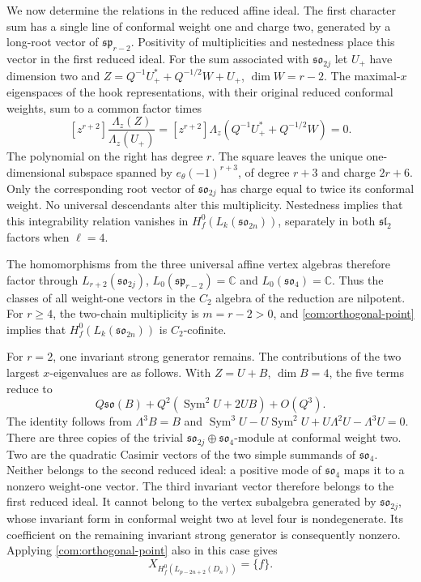 \documentclass[11pt,a4paper]{amsart}
\numberwithin{equation}{section}
\theoremstyle{definition}
\theoremstyle{remark}
\newcommand{\C}{\mathbb C}
\newcommand{\spg}{\mathfrak{sp}}
\newcommand{\sog}{\mathfrak{so}}
\newcommand{\slg}{\mathfrak{sl}}
\newcommand{\Sym}{\operatorname{Sym}}
\begin{document}
We now determine the relations in the reduced affine ideal. The first character sum has a single
line of conformal weight one and charge two, generated by a long-root
vector of $\spg_{r-2}$. Positivity of multiplicities and nestedness place
this vector in the first reduced ideal.
For the sum associated with $\sog_{2j}$ let $U_+$ have dimension two and
$Z=Q^{-1}U_+^*+Q^{-1/2}W+U_+$, $\dim W=r-2$.
The maximal-$x$ eigenspaces of the hook representations, with their
original reduced conformal weights, sum to a common
factor times
$$
 [z^{r+2}]\frac{\Lambda_z(Z)}{\Lambda_z(U_+)}
 =[z^{r+2}]\Lambda_z(Q^{-1}U_+^*+Q^{-1/2}W)=0.
$$
The polynomial on the right has degree $r$. The square leaves the
unique one-dimensional subspace spanned by $e_\theta(-1)^{r+3}$,
of degree $r+3$ and charge
$2r+6$. Only the corresponding root vector of $\sog_{2j}$ has charge equal to twice its conformal weight.
No universal descendants alter this multiplicity. Nestedness implies that this integrability relation vanishes in
$H_f^0(L_k(\sog_{2n}))$, separately in both
$\slg_2$ factors when $\ell=4$.

The homomorphisms from the three universal affine vertex algebras
therefore factor through $L_{r+2}(\sog_{2j})$,
$L_0(\spg_{r-2})=\C$ and $L_0(\sog_4)=\C$.
Thus the classes of all weight-one vectors in the $C_2$ algebra of
the reduction are nilpotent. For $r\ge4$, the two-chain
multiplicity is $m=r-2>0$, and \cref{com:orthogonal-point} implies that
$H_f^0(L_k(\sog_{2n}))$ is $C_2$-cofinite.

For $r=2$, one invariant strong generator remains. The contributions of
the two largest $x$-eigenvalues are as follows. With $Z=U+B$,
$\dim B=4$, the five terms reduce to
$$
 Q\sog(B)+Q^2(\Sym^2U+2UB)+O(Q^3).
$$
The identity follows from $\Lambda^3B=B$ and
$\Sym^3U-U\Sym^2U+U\Lambda^2U-\Lambda^3U=0$.
There are three copies of the trivial $\sog_{2j}\oplus\sog_4$-module
at conformal weight two. Two are the quadratic Casimir vectors of
the two simple summands of $\sog_4$. Neither belongs to the second
reduced ideal: a positive mode of $\sog_4$ maps it to a nonzero
weight-one vector. The third invariant vector therefore belongs to
the first reduced ideal. It cannot belong to the vertex subalgebra
generated by $\sog_{2j}$, whose invariant form in conformal weight
two at level four is nondegenerate. Its coefficient on the remaining
invariant strong generator is consequently nonzero. Applying
\cref{com:orthogonal-point} also in this case gives
\begin{equation}\label{seed:D-actual}
 X_{H_f^0(L_{p-2n+2}(D_n))}=\{f\}.
\end{equation}
\end{document}
